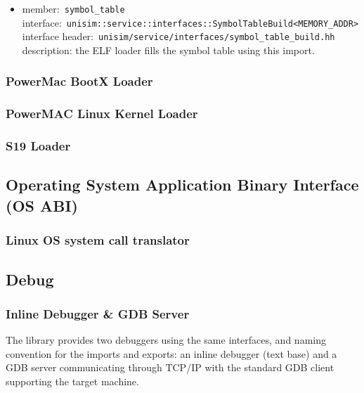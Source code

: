 \begin{itemize}
\begin{itemize}
		\item member:~\texttt{symbol\_table}\\
		interface:~\texttt{unisim::service::interfaces::SymbolTableBuild<MEMORY\_ADDR>}\\
		interface header:~\texttt{unisim/service/interfaces/symbol\_table\_build.hh}
		description: the ELF loader fills the symbol table using this import.
	\end{itemize}
\end{itemize}



\subsubsection{PowerMac BootX Loader}

\subsubsection{PowerMAC Linux Kernel Loader}

\subsubsection{S19 Loader}

\subsection{Operating System Application Binary Interface (OS ABI)}

\subsubsection{Linux OS system call translator}

\subsection{Debug}

\subsubsection{Inline Debugger \& GDB Server}

The library provides two debuggers using the same interfaces, and naming convention for the imports and exports: an inline debugger (text base) and a GDB server communicating through TCP/IP with the standard GDB client supporting the target machine.


